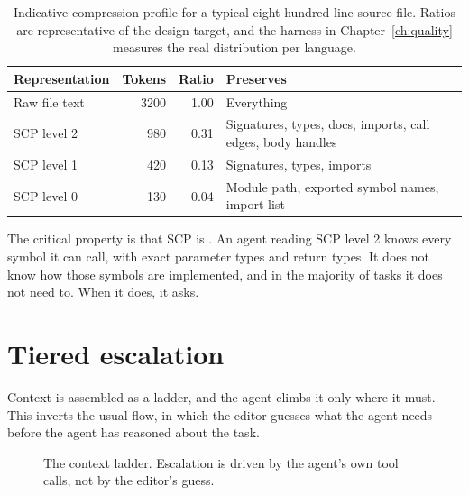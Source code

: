 \begin{table}[h]
\centering
\small
\begin{tabularx}{\textwidth}{l r r X}
\toprule
\textbf{Representation} & \textbf{Tokens} & \textbf{Ratio} & \textbf{Preserves} \\
\midrule
Raw file text & 3200 & 1.00 & Everything \\
SCP level 2 & 980 & 0.31 & Signatures, types, docs, imports, call edges, body handles \\
SCP level 1 & 420 & 0.13 & Signatures, types, imports \\
SCP level 0 & 130 & 0.04 & Module path, exported symbol names, import list \\
\bottomrule
\end{tabularx}
\caption{Indicative compression profile for a typical eight hundred line source file. Ratios are
representative of the design target, and the harness in Chapter~\ref{ch:quality} measures the
real distribution per language.}
\end{table}

The critical property is that SCP is . An agent
reading SCP level 2 knows every symbol it can call, with exact parameter types and return
types. It does not know how those symbols are implemented, and in the majority of tasks it
does not need to. When it does, it asks.

\section{Tiered escalation}

Context is assembled as a ladder, and the agent climbs it only where it must. This inverts
the usual flow, in which the editor guesses what the agent needs before the agent has
reasoned about the task.

\begin{figure}[h]
\centering
{}
\caption{The context ladder. Escalation is driven by the agent's own tool calls, not by
the editor's guess.}
\end{figure}


